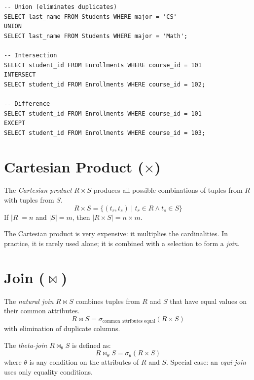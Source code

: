 \begin{codeblock}[title=\textbf{Set Operators in SQL}]
\begin{verbatim}
-- Union (eliminates duplicates)
SELECT last_name FROM Students WHERE major = 'CS'
UNION
SELECT last_name FROM Students WHERE major = 'Math';

-- Intersection
SELECT student_id FROM Enrollments WHERE course_id = 101
INTERSECT
SELECT student_id FROM Enrollments WHERE course_id = 102;

-- Difference
SELECT student_id FROM Enrollments WHERE course_id = 101
EXCEPT
SELECT student_id FROM Enrollments WHERE course_id = 103;
\end{verbatim}
\end{codeblock}

\section{Cartesian Product ($\times$)}

\begin{definition}
The \emph{Cartesian product} $R \times S$ produces all possible combinations
of tuples from $R$ with tuples from $S$.
\[
R \times S = \{ (t_r, t_s) \mid t_r \in R \land t_s \in S \}
\]
If $|R| = n$ and $|S| = m$, then $|R \times S| = n \times m$.
\end{definition}

\begin{warning}[title=\textbf{Cost of the Cartesian Product}]
The Cartesian product is very expensive: it multiplies the cardinalities.
In practice, it is rarely used alone; it is combined with a selection to
form a \emph{join}.
\end{warning}

\section{Join ($\bowtie$)}

\begin{definition}
The \emph{natural join} $R \bowtie S$ combines tuples from $R$ and $S$ that
have equal values on their common attributes.
\[
R \bowtie S = \sigma_{\text{common attributes equal}}(R \times S)
\]
with elimination of duplicate columns.
\end{definition}

\begin{definition}
The \emph{theta-join} $R \bowtie_\theta S$ is defined as:
\[
R \bowtie_\theta S = \sigma_\theta(R \times S)
\]
where $\theta$ is any condition on the attributes of $R$ and $S$.
Special case: an \emph{equi-join} uses only equality conditions.
\end{definition}

